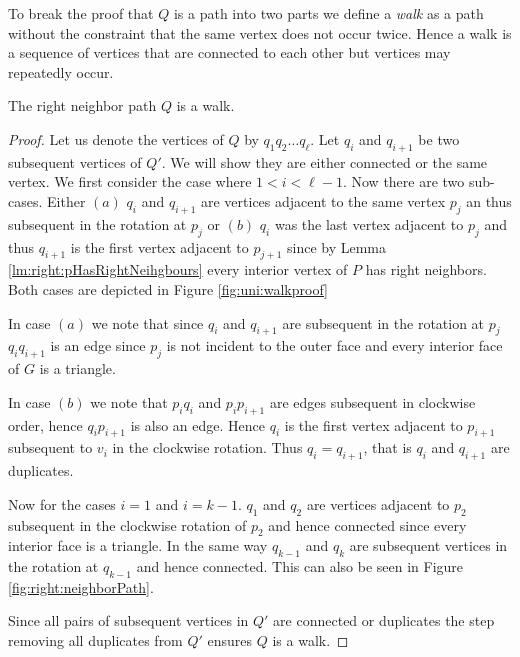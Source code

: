     To break the proof that $Q$ is a path into two parts we define a \emph{walk} as a path without the constraint that the same vertex does not occur twice. Hence a walk is a sequence of vertices that are connected to each other but vertices may repeatedly occur.
    \begin{lemma}
      \label{lm:right:neighborWalk}
      The right neighbor path $Q$ is a walk.
    \end{lemma}
    \begin{proof}
      Let us denote the vertices of $Q$ by $q_1 q_2 \ldots q_\ell$.
      Let $q_i$ and $q_{i+1}$ be two subsequent vertices of $Q'$. We will show they are either connected or the same vertex. We first consider the case where $1 < i < \ell-1$.
      Now there are two sub-cases. Either $(a)$ $q_i$ and $ q_{i+1}$ are vertices adjacent to the same vertex $p_j$ an thus subsequent in the rotation at $p_j$ or $(b)$ $q_i$ was the last vertex adjacent to $p_j$ and thus $q_{i+1}$ is the first vertex adjacent to $p_{j+1}$ since by Lemma \ref{lm:right:pHasRightNeihgbours} every interior vertex of $P$ has right neighbors.
      Both cases are depicted in Figure \ref{fig:uni:walkproof}

      In case $(a)$ we note that since $q_i$ and $q_{i+1}$ are subsequent in the rotation at $p_j$ $q_i q_{i+1}$ is an edge since $p_j$ is not incident to the outer face and every interior face of $G$ is a triangle.

      In case $(b)$ we note that $p_i q_i$ and $p_i p_{i+1}$ are edges subsequent in clockwise order, hence $q_{i} p_{i+1}$ is also an edge. Hence $q_i$ is the first vertex adjacent to $p_{i+1}$ subsequent to $v_i$ in the clockwise rotation. Thus $q_{i} = q_{i+1}$, that is $q_i$ and $q_{i+1}$ are duplicates.

      Now for the cases $i=1$ and $i=k-1$. $q_1$ and $q_2$ are vertices adjacent to $p_{2}$ subsequent in the clockwise rotation of ${p_2}$ and hence connected since every interior face is a triangle. In the same way $q_{k-1}$ and $q_k$ are subsequent vertices in the rotation at $q_{k-1}$ and hence connected. This can also be seen in Figure \ref{fig:right:neighborPath}.

      Since all pairs of subsequent vertices in $Q'$ are connected or duplicates the step removing all duplicates from $Q'$ ensures $Q$ is a walk.


\end{proof}
